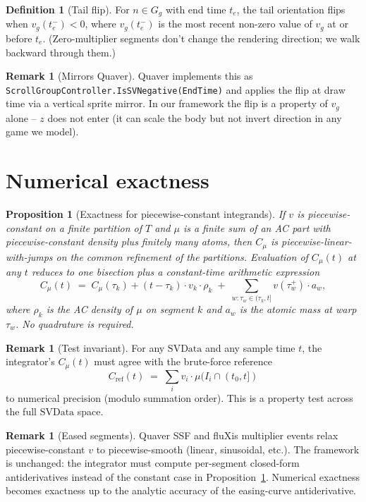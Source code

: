 \documentclass[11pt]{article}
\newtheorem{proposition}[theorem]{Proposition}
\theoremstyle{definition}
\newtheorem{definition}[theorem]{Definition}
\newtheorem{remark}[theorem]{Remark}
\begin{document}
\begin{definition}[Tail flip]
\label{def:tail-flip}
For $n \in G_g$ with end time $t_e$, the tail orientation flips when
$v_g(t_e^-) < 0$, where $v_g(t_e^-)$ is the most recent non-zero value
of $v_g$ at or before $t_e$. (Zero-multiplier segments don't change
the rendering direction; we walk backward through them.)
\end{definition}

\begin{remark}[Mirrors Quaver]
Quaver implements this as
\texttt{ScrollGroupController.IsSVNegative(EndTime)} and applies the
flip at draw time via a vertical sprite mirror. In our framework the
flip is a property of $v_g$ alone -- $z$ does not enter (it can scale
the body but not invert direction in any game we model).
\end{remark}

\section{Numerical exactness}
\label{sec:numerics}

\begin{proposition}[Exactness for piecewise-constant integrands]
\label{prop:exact}
If $v$ is piecewise-constant on a finite partition of $T$ and $\mu$ is a finite
sum of an AC part with piecewise-constant density plus finitely many atoms,
then $C_\mu$ is piecewise-linear-with-jumps on the common refinement of
the partitions. Evaluation of $C_\mu(t)$ at any $t$ reduces to one bisection
plus a constant-time arithmetic expression
\[
C_\mu(t) \;=\; C_\mu(\tau_k) + (t - \tau_k) \cdot v_k \cdot \rho_k
\;+\; \sum_{w : \tau_w \in (\tau_k, t]} v(\tau_w^+) \cdot a_w,
\]
where $\rho_k$ is the AC density of $\mu$ on segment $k$ and $a_w$ is the
atomic mass at warp $\tau_w$. No quadrature is required.
\end{proposition}

\begin{remark}[Test invariant]
For any $\mathrm{SVData}$ and any sample time $t$, the integrator's
$C_\mu(t)$ must agree with the brute-force reference
\[
C_{\mathrm{ref}}(t) \;=\; \sum_i v_i \cdot \mu(I_i \cap (t_0, t])
\]
to numerical precision (modulo summation order). This is a property test
across the full $\mathrm{SVData}$ space.
\end{remark}

\begin{remark}[Eased segments]
Quaver SSF and fluXis multiplier events relax piecewise-constant $v$ to
piecewise-smooth (linear, sinusoidal, etc.). The framework is unchanged: the
integrator must compute per-segment closed-form antiderivatives instead of
the constant case in Proposition~\ref{prop:exact}. Numerical exactness becomes
exactness up to the analytic accuracy of the easing-curve antiderivative.
\end{remark}
\end{document}
